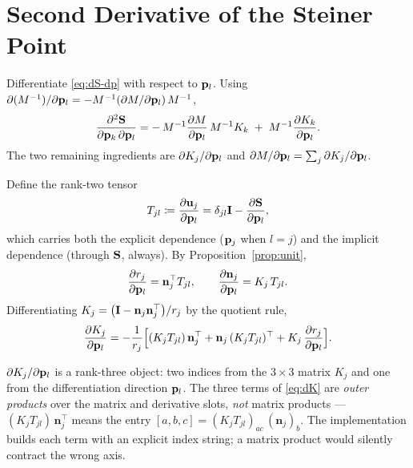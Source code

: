\documentclass[11pt,a4paper]{article}
\begin{document}
\section{Second Derivative of the Steiner Point}
\label{sec:second-S}

Differentiate \eqref{eq:dS-dp} with respect to $\mathbf{p}_{l}$.  Using
$\partial(M^{-1})/\partial\mathbf{p}_{l}
= -M^{-1}(\partial M/\partial\mathbf{p}_{l})\,M^{-1}$,
\begin{equation}
  \dfrac{\partial^2 \mathbf{S}}{\partial \mathbf{p}_{k}\,\partial \mathbf{p}_{l}}
   = -\,M^{-1}\dfrac{\partial M}{\partial \mathbf{p}_{l}}\,M^{-1}K_k
     \;+\; M^{-1}\dfrac{\partial K_k}{\partial \mathbf{p}_{l}}.
  \label{eq:d2S}
\end{equation}
The two remaining ingredients are $\partial K_j/\partial\mathbf{p}_{l}$ and
$\partial M/\partial\mathbf{p}_{l} = \sum_j\partial K_j/\partial\mathbf{p}_{l}$.

Define the rank-two tensor
\begin{equation}
  T_{jl} \coloneqq \dfrac{\partial \mathbf{u}_j}{\partial \mathbf{p}_{l}}
        = \delta_{jl}\mathbf{I} - \dfrac{\partial \mathbf{S}}{\partial \mathbf{p}_{l}},
\end{equation}
which carries both the explicit dependence ($\mathbf{p}_{j}$ when $l=j$) and the
implicit dependence (through $\mathbf{S}$, always).  By Proposition~\ref{prop:unit},
\begin{equation}
  \dfrac{\partial r_j}{\partial \mathbf{p}_{l}} = \mathbf{n}_j^\top T_{jl},
  \qquad
  \dfrac{\partial \mathbf{n}_j}{\partial \mathbf{p}_{l}} = K_j\,T_{jl}.
\end{equation}
Differentiating $K_j = \bigl(\mathbf{I} - \mathbf{n}_j \mathbf{n}_j^\top\bigr)/r_j$ by the quotient rule,
\begin{equation}
  \dfrac{\partial K_j}{\partial \mathbf{p}_{l}}
   = -\frac{1}{r_j}\Bigl[
        (K_j T_{jl})\,\mathbf{n}_j^\top
        + \mathbf{n}_j\,(K_j T_{jl})^\top
        + K_j\,\dfrac{\partial r_j}{\partial \mathbf{p}_{l}}
      \Bigr].
  \label{eq:dK}
\end{equation}

\begin{remark}
\label{rem:rank3}
$\partial K_j/\partial\mathbf{p}_{l}$ is a rank-three object: two indices from the
$3\times3$ matrix $K_j$ and one from the differentiation direction $\mathbf{p}_{l}$.
The three terms of \eqref{eq:dK} are \emph{outer products} over the matrix and
derivative slots, \emph{not} matrix products --- $(K_j T_{jl})\,\mathbf{n}_j^\top$
means the entry $[a,b,c] = (K_j T_{jl})_{ac}\,(\mathbf{n}_j)_b$.  The
implementation builds each term with an explicit  index
string; a matrix product would silently contract the wrong axis.
\end{remark}
\end{document}
